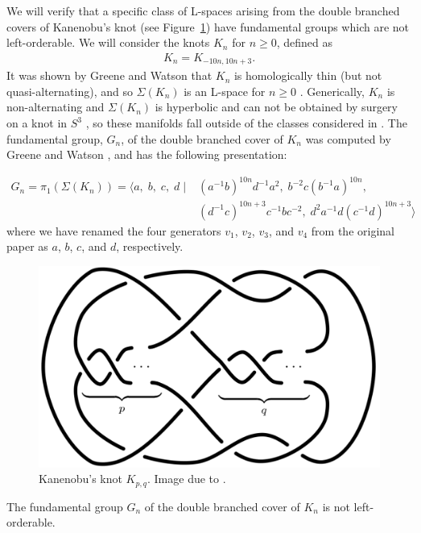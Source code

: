 We will verify that a specific class of L-spaces arising from the double branched covers of Kanenobu's knot (see Figure~\ref{figure:kanenobu}) have fundamental groups which are not left-orderable. We will consider the knots $K_n$ for $n\geq{}0$, defined as
\begin{align*}
K_n=K_{-10n,10n+3}.
\end{align*}
\noindent{}It was shown by Greene and Watson that $K_n$ is homologically thin (but not quasi-alternating), and so $\Sigma{}(K_n)$ is an L-space for $n\geq{}0$ \cite[Proposition 11]{GreeneWatson}. Generically, $K_n$ is non-alternating and $\Sigma{}(K_n)$ is hyperbolic and can not be obtained by surgery on a knot in $S^{3}$ \cite{HoffmanWalsh}, so these manifolds fall outside of the classes considered in \cite{BoyerGordonWatson}. The fundamental group, $G_n$, of the double branched cover of $K_n$ was computed by Greene and Watson \cite{GreeneWatson}, and has the following presentation:


\begin{align*}
G_n=\pi{}_1(\Sigma{}(K_n))=\langle a,\; b,\; c,\; d \mid{} &(a^{-1}b)^{10n}d^{-1}a^{2},\; b^{-2}c(b^{-1}a)^{10n},\\
&(d^{-1}c)^{10n+3}c^{-1}bc^{-2},\; d^{2}a^{-1}d(c^{-1}d)^{10n+3} \rangle
\end{align*}
where we have renamed the four generators $v_1$, $v_2$, $v_3$, and $v_4$ from the original paper as $a$, $b$, $c$, and $d$, respectively.

\begin{figure}[ht]
\includegraphics[scale=.37]{kanenobu}
\caption{Kanenobu's knot $K_{p,q}$. Image due to \cite{GreeneWatson}.}
\label{figure:kanenobu}
\end{figure}

\begin{theorem*} The fundamental group $G_n$ of the double branched cover of $K_n$ is not left-orderable.
\label{MAINTHEOREM}
\end{theorem*}

